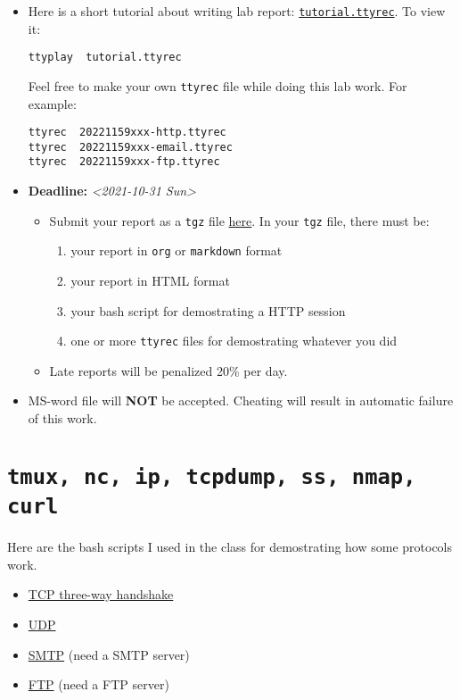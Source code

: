 \documentclass{article} [NO-DEFAULT-PACKAGES] \usepackage{wx672hyperref}
\begin{document}
\begin{itemize}
\item Here is a short tutorial about writing lab report: \href{tutorial.ttyrec}{\texttt{tutorial.ttyrec}}. To view it:

\begin{verbatim}
ttyplay  tutorial.ttyrec
\end{verbatim}


Feel free to make your own \texttt{ttyrec} file while doing this lab work. For example:

\begin{verbatim}
ttyrec  20221159xxx-http.ttyrec
ttyrec  20221159xxx-email.ttyrec
ttyrec  20221159xxx-ftp.ttyrec
\end{verbatim}

\item \textbf{Deadline:} \textit{<2021-10-31 Sun> } 

\begin{itemize}
\item Submit your report as a \texttt{tgz} file \href{https://cs6.swfu.edu.cn/moodle/mod/assign/view.php?id=536}{here}. In your \texttt{tgz} file, there must be:
\begin{enumerate}
\item your report in \texttt{org} or \texttt{markdown} format
\item your report in HTML format
\item your bash script for demostrating a HTTP session
\item one or more \texttt{ttyrec} files for demostrating whatever you did
\end{enumerate}

\item Late reports will be penalized 20\% per day.
\end{itemize}

\item MS-word file will \textbf{NOT} be accepted. Cheating will result in automatic failure of this
work.
\end{itemize}

\section{\texttt{tmux, nc, ip, tcpdump, ss, nmap, curl}}
\label{sec:orga451444}

Here are the bash scripts I used in the class for demostrating how some protocols work.

\begin{itemize}
\item \href{https://cs6.swfu.edu.cn/\~wx672/lecture\_notes/network\_basics/scripts/tmux-demo-3way.handshake.sh}{TCP three-way handshake}
\item \href{https://cs6.swfu.edu.cn/\~wx672/lecture\_notes/network\_basics/scripts/tmux-demo-udp.sh}{UDP}
\item \href{https://cs6.swfu.edu.cn/\~wx672/lecture\_notes/network\_basics/scripts/tmux-demo-smtp.sh}{SMTP} (need a SMTP server)
\item \href{https://cs6.swfu.edu.cn/\~wx672/lecture\_notes/network\_basics/scripts/tmux-demo-ftp.sh}{FTP} (need a FTP server)
\end{itemize}
\end{document}
